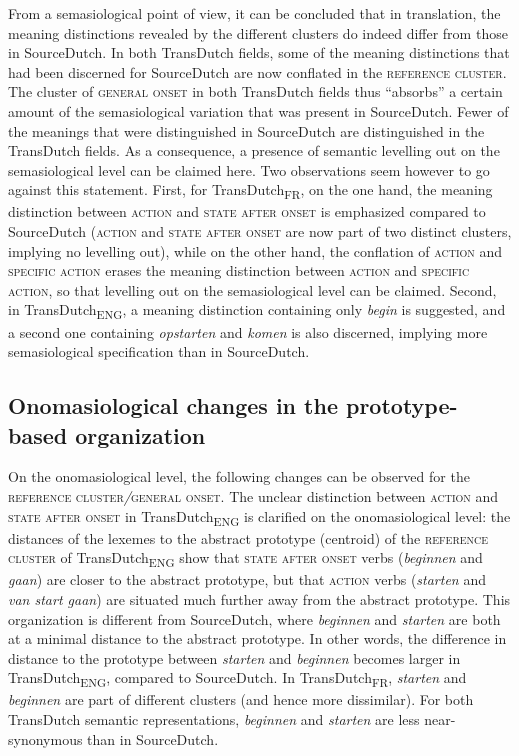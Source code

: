 From a semasiological point of view, it can be concluded that in translation, the meaning distinctions revealed by the different clusters do indeed differ from those in SourceDutch. In both TransDutch fields, some of the meaning distinctions that had been discerned for SourceDutch are now conflated in the \textsc{reference cluster}. The cluster of \textsc{general onset} in both TransDutch fields thus ``absorbs'' a certain amount of the semasiological variation that was present in SourceDutch. Fewer of the meanings that were distinguished in SourceDutch are distinguished in the TransDutch fields. As a consequence, a presence of semantic levelling out on the semasiological level can be claimed here. Two observations seem however to go against this statement. First, for TransDutch\textsubscript{FR}, on the one hand, the meaning distinction between \textsc{action} and \textsc{state after onset} is emphasized compared to SourceDutch (\textsc{action} and \textsc{state after onset} are now part of two distinct clusters, implying no levelling out), while on the other hand, the conflation of \textsc{action} and {\textsc{specific}} \textsc{action} erases the meaning distinction between \textsc{action} and {\textsc{specific}} \textsc{action}, so that levelling out on the semasiological level can be claimed. Second, in TransDutch\textsubscript{ENG}, a meaning distinction containing only \textit{begin} is suggested, and a second one containing \textit{opstarten} and \textit{komen} is also discerned, implying more semasiological specification than in SourceDutch.

\subsection{Onomasiological changes in the prototype-based organization}
\label{sec:4.5.2}  
On the onomasiological level, the following changes can be observed for the \textsc{reference cluster}\textit{/}\textsc{general onset}. The unclear distinction between \textsc{action} and \textsc{state after onset} in TransDutch\textsubscript{ENG} is clarified on the onomasiological level: the distances of the lexemes to the abstract prototype (centroid) of the \textsc{reference cluster} of TransDutch\textsubscript{ENG} show that \textsc{state after onset} verbs (\textit{beginnen} and \textit{gaan}) are closer to the abstract prototype, but that \textsc{action} verbs (\textit{starten} and \textit{van start gaan}) are situated much further away from the abstract prototype. This organization is different from SourceDutch, where \textit{beginnen} and \textit{starten} are both at a minimal distance to the abstract prototype. In other words, the difference in distance to the prototype between \textit{starten} and \textit{beginnen} becomes larger in TransDutch\textsubscript{ENG}, compared to SourceDutch. In TransDutch\textsubscript{FR}, \textit{starten} and \textit{beginnen} are part of different clusters (and hence more dissimilar). For both TransDutch semantic representations, \textit{beginnen} and \textit{starten} are less near-synonymous than in SourceDutch.

